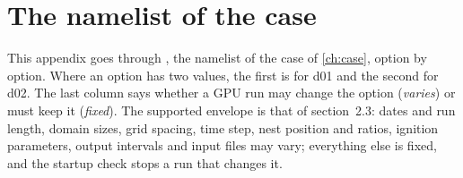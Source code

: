 \chapter{The namelist of the case}\label{app:namelist}

This appendix goes through , the namelist of the case of \cref{ch:case},
option by option. Where an option has two values, the first is for d01 and the second for d02. The last column says
whether a GPU run may change the option (\emph{varies}) or must keep it (\emph{fixed}). The supported envelope is that
of  section~2.3: dates and run length, domain sizes, grid spacing, time step, nest position and ratios,
ignition parameters, output intervals and input files may vary; everything else is fixed, and the startup check
 stops a run that changes it.

